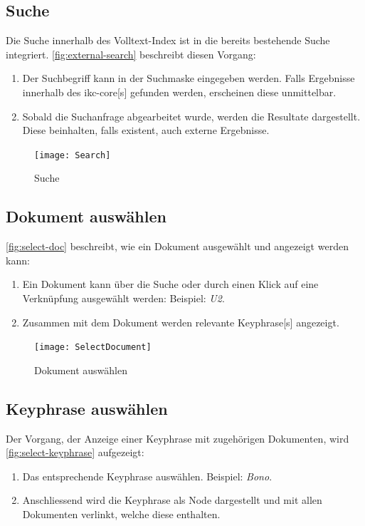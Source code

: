 \subsection{Suche}
Die Suche innerhalb des Volltext-Index ist in die bereits bestehende Suche integriert. \autoref{fig:external-search} beschreibt diesen Vorgang:
\begin{enumerate}
    \item Der Suchbegriff kann in der Suchmaske eingegeben werden. Falls Ergebnisse innerhalb des \gls{ikc-core}[s] gefunden werden, erscheinen diese unmittelbar.
    \item Sobald die Suchanfrage abgearbeitet wurde, werden die Resultate dargestellt. Diese beinhalten, falls existent, auch externe Ergebnisse.
\end{enumerate}

\begin{figure}[ht]
\centering
\texttt{[image: Search]}
\caption{Suche}
\label{fig:external-search}
\end{figure}

\subsection{Dokument auswählen}
\autoref{fig:select-doc} beschreibt, wie ein Dokument ausgewählt und angezeigt werden kann:
\begin{enumerate}
    \item Ein Dokument kann über die Suche oder durch einen Klick auf eine Verknüpfung ausgewählt werden: Beispiel: \textit{U2}.
    \item Zusammen mit dem Dokument werden relevante \gls{Keyphrase}[s] angezeigt.
\end{enumerate}

\begin{figure}[ht]
\centering
\texttt{[image: SelectDocument]}
\caption{Dokument auswählen}
\label{fig:select-doc}
\end{figure}

\subsection{Keyphrase auswählen}

Der Vorgang, der Anzeige einer \gls{Keyphrase} mit zugehörigen Dokumenten, wird \autoref{fig:select-keyphrase} aufgezeigt:
\begin{enumerate}
    \item Das entsprechende \gls{Keyphrase} auswählen. Beispiel: \textit{Bono}.
    \item Anschliessend wird die \gls{Keyphrase} als Node dargestellt und mit allen Dokumenten verlinkt, welche diese enthalten. 
\end{enumerate}

